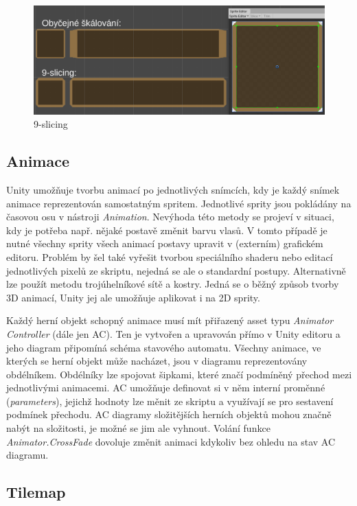 \documentclass[FM,Proj]{tulthesis}
\begin{document}
	\begin{figure}[ht]
		\centering
		\includegraphics[width=\textwidth]{img/9Slicing}
		\caption{9-slicing}
		\label{img9Slicing}
	\end{figure}
	
	\subsection{Animace}
	
	Unity umožňuje tvorbu animací po jednotlivých snímcích, kdy je každý snímek animace reprezentován samostatným spritem. Jednotlivé sprity jsou pokládány na časovou osu v nástroji \textit{Animation}. Nevýhoda této metody se projeví v situaci, kdy je potřeba např. nějaké postavě změnit barvu vlasů. V tomto případě je nutné všechny sprity všech animací postavy upravit v (externím) grafickém editoru. Problém by šel také vyřešit tvorbou speciálního shaderu nebo editací jednotlivých pixelů ze skriptu, nejedná se ale o standardní postupy. Alternativně lze použít metodu trojúhelníkové sítě a kostry. Jedná se o běžný způsob tvorby 3D animací, Unity jej ale umožňuje aplikovat i na 2D sprity.
	
	Každý herní objekt schopný animace musí mít přiřazený asset typu \textit{Animator Controller} (dále jen AC). Ten je vytvořen a upravován přímo v Unity editoru a jeho diagram připomíná schéma stavového automatu. Všechny animace, ve kterých se herní objekt může nacházet, jsou v diagramu reprezentovány obdélníkem. Obdélníky lze spojovat šipkami, které značí podmíněný přechod mezi jednotlivými animacemi. AC umožňuje definovat si v něm interní proměnné (\textit{parameters}), jejichž hodnoty lze měnit ze skriptu a využívají se pro sestavení podmínek přechodu. AC diagramy složitějších herních objektů mohou značně nabýt na složitosti, je možné se jim ale vyhnout. Volání funkce \textit{Animator.CrossFade} dovoluje změnit animaci kdykoliv bez ohledu na stav AC diagramu.
	
	\subsection{Tilemap}
	
\end{document}
